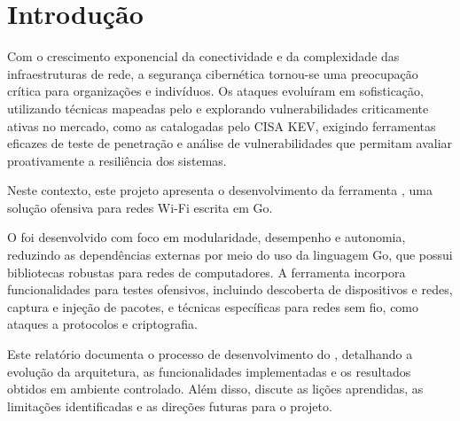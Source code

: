 \section{Introdução}
Com o crescimento exponencial da conectividade e da complexidade das infraestruturas de rede, a segurança cibernética tornou-se uma preocupação crítica para organizações e indivíduos. Os ataques evoluíram em sofisticação, utilizando técnicas mapeadas pelo \mitreattack e explorando vulnerabilidades criticamente ativas no mercado, como as catalogadas pelo CISA KEV, exigindo ferramentas eficazes de teste de penetração e análise de vulnerabilidades que permitam avaliar proativamente a resiliência dos sistemas.

Neste contexto, este projeto apresenta o desenvolvimento da ferramenta \offscan, uma solução ofensiva para redes Wi-Fi escrita em Go.

O \offscan foi desenvolvido com foco em modularidade, desempenho e autonomia, reduzindo as dependências externas por meio do uso da linguagem Go, que possui bibliotecas robustas para redes de computadores. A ferramenta incorpora funcionalidades para testes ofensivos, incluindo descoberta de dispositivos e redes, captura e injeção de pacotes, e técnicas específicas para redes sem fio, como ataques a protocolos e criptografia.

Este relatório documenta o processo de desenvolvimento do \offscan, detalhando a evolução da arquitetura, as funcionalidades implementadas e os resultados obtidos em ambiente controlado. Além disso, discute as lições aprendidas, as limitações identificadas e as direções futuras para o projeto.